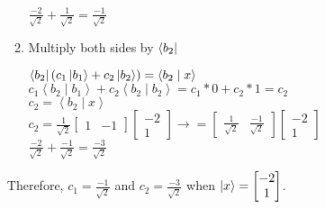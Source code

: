 \documentclass[12pt]{article}
\theoremstyle{plain}
\theoremstyle{nonumberplain}
\theoremstyle{plain}
\theoremstyle{nonumberplain}
\newcommand\1{{\bf 1}}
\newcommand{\bmat}[1]{\begin{bmatrix*} #1 \end{bmatrix*}} %
\newcommand{\<}{\left\langle}
\renewcommand{\>}{\right\rangle}
\newcommand{\inp}[2]{\left\langle#1\mid #2\right\rangle} %
\begin{document}
\begin{enumerate}[label=(\alph*)]
\begin{enumerate}[label=(\roman*)]
\begin{center}
		$\frac{-2}{\sqrt{2}}+\frac{1}{\sqrt{2}}=\frac{-1}{\sqrt{2}}$ \\
		\end{center}
		\item Multiply both sides by $\bra{b_2}$
		\begin{center}
		$\bra{b_2}(c_1\ket{b_1}+c_2\ket{b_2})=\inp{b_2}{x}$ \\
		$c_1\inp{b_2}{b_1}+c_2\inp{b_2}{b_2} = c_1*0+c_2*1=c_2$ \\
		$c_2=\inp{b_2}{x}$ \\
		
		$c_2=\frac{1}{\sqrt{2}}\bmat{1 & -1}\bmat{-2 \\ 1}\longrightarrow =\bmat{\frac{1}{\sqrt{2}} & \frac{-1}				{\sqrt{2}}}\bmat{-2 \\ 1}$ \\
		$\frac{-2}{\sqrt{2}}+\frac{-1}{\sqrt{2}}=\frac{-3}{\sqrt{2}}$ \\
		\end{center}
	\end{enumerate}
	Therefore, $c_1=\frac{-1}{\sqrt{2}}$ and $c_2=\frac{-3}{\sqrt{2}}$ when $\ket{x}=\bmat{-2 \\ 1}$.
\end{enumerate}

\end{document}
